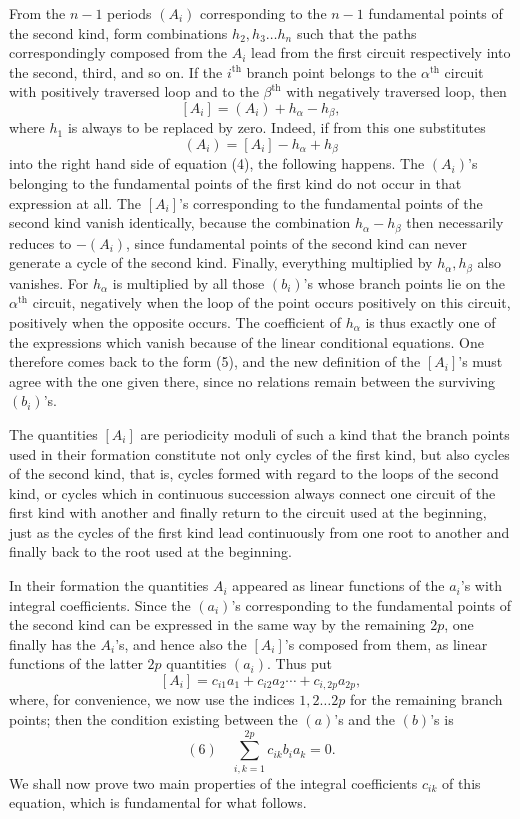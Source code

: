\documentclass[10pt]{article}
\begin{document}
From the \(n-1\) periods \((A_i)\) corresponding to the \(n-1\) fundamental points of the second kind, form combinations \(h_2,h_3\ldots h_n\) such that the paths correspondingly composed from the \(A_i\) lead from the first circuit respectively into the second, third, and so on. If the \(i^{\text{th}}\) branch point belongs to the \(\alpha^{\text{th}}\) circuit with positively traversed loop and to the \(\beta^{\text{th}}\) with negatively traversed loop, then
\[
{}[A_i]=(A_i)+h_{\alpha}-h_{\beta},
\]
where \(h_1\) is always to be replaced by zero. Indeed, if from this one substitutes
\[
(A_i)=[A_i]-h_{\alpha}+h_{\beta}
\]
into the right hand side of equation (4), the following happens. The \((A_i)\)'s belonging to the fundamental points of the first kind do not occur in that expression at all. The \([A_i]\)'s corresponding to the fundamental points of the second kind vanish identically, because the combination \(h_{\alpha}-h_{\beta}\) then necessarily reduces to \(-(A_i)\), since fundamental points of the second kind can never generate a cycle of the second kind. Finally, everything multiplied by \(h_{\alpha},h_{\beta}\) also vanishes. For \(h_{\alpha}\) is multiplied by all those \((b_i)\)'s whose branch points lie on the \(\alpha^{\text{th}}\) circuit, negatively when the loop of the point occurs positively on this circuit, positively when the opposite occurs. The coefficient of \(h_{\alpha}\) is thus exactly one of the expressions which vanish because of the linear conditional equations. One therefore comes back to the form (5), and the new definition of the \([A_i]\)'s must agree with the one given there, since no relations remain between the surviving \((b_i)\)'s.

The quantities \([A_i]\) are periodicity moduli of such a kind that the branch points used in their formation constitute not only cycles of the first kind, but also cycles of the second kind, that is, cycles formed with regard to the loops of the second kind, or cycles which in continuous succession always connect one circuit of the first kind with another and finally return to the circuit used at the beginning, just as the cycles of the first kind lead continuously from one root to another and finally back to the root used at the beginning.

In their formation the quantities \(A_i\) appeared as linear functions of the \(a_i\)'s with integral coefficients. Since the \((a_i)\)'s corresponding to the fundamental points of the second kind can be expressed in the same way by the remaining \(2p\), one finally has the \(A_i\)'s, and hence also the \([A_i]\)'s composed from them, as linear functions of the latter \(2p\) quantities \((a_i)\). Thus put
\[
{}[A_i]=c_{i1}a_1+c_{i2}a_2\cdots+c_{i,2p}a_{2p},
\]
where, for convenience, we now use the indices \(1,2\ldots2p\) for the remaining branch points; then the condition existing between the \((a)\)'s and the \((b)\)'s is
\[
(6)\quad \sum_{i,k=1}^{2p} c_{ik}b_i a_k=0.
\]
We shall now prove two main properties of the integral coefficients \(c_{ik}\) of this equation, which is fundamental for what follows.
\end{document}
